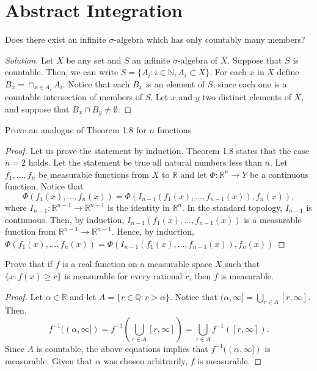 \documentclass[14.5pt]{article}
\newcommand{\N}{\mathbb{N}}
\newcommand{\Q}{\mathbb{Q}}
\newcommand{\R}{\mathbb{R}}
\newenvironment{pr}[2][Problem]{\begin{mdframed}[backgroundcolor=gray!10, leftline = false, rightline=false, linewidth=0.25pt]  \begin{trivlist}
\item[\hskip \labelsep {\bfseries #1}\hskip \labelsep {\bfseries #2.}]}{\end{trivlist} \end{mdframed}  }
\newenvironment{solution}
  {\begin{proof}[Solution]}
  {\end{proof}}
\begin{document}
\section{Abstract Integration}

\begin{pr}{1.1} Does there exist an infinite $\sigma$-algebra which has only countably many members?
\end{pr}
\begin{solution}
Let $X$ be any set and $S$ an infinite $\sigma$-algebra of $X$. Suppose that $S$ is countable. Then, we can write $S = \{A_i: i \in \N, A_i \subset X \}$. For each $x$ in $X$ define $B_x = \cap_{x \in A_i} A_i$. Notice that each $B_x$ is an element of $S$, since each one is a countable intersection of members of $S$. Let $x$ and $y$ two distinct elements of $X$, and suppose that $B_x \cap B_y \neq \emptyset.$ 
\end{solution}


\begin{pr}{1.2} Prove an analogue of Theorem 1.8 for $n$ functions  
\end{pr}
\begin{proof}
Let us prove the statement by induction. Theorem 1.8 states that the case $n = 2$ holds. Let the statement be true all natural numbers less than $n$. Let $f_1, \ldots, f_n$ be measurable functions from $X$ to $\R$ and let $\Phi: \R^n \to Y$ be a continuous function. Notice that 
$$\Phi(f_1(x), \ldots, f_n(x)) = \Phi(I_{n-1}(f_1(x), \ldots, f_{n-1}(x)), f_n(x)),$$
where $I_{n-1}:\R^{n-1} \rightarrow \R^{n-1}$ is the identity in $\R^n$. In the standard topology, $I_{n-1}$ is continuous. Then, by induction, $I_{n-1}(f_1(x), \ldots, f_{n-1}(x))$ is a measurable function from $\R^{n-1} \rightarrow \R^{n-1}$. Hence, by induction, $\Phi(f_1(x), \ldots, f_n(x)) = \Phi(I_{n-1}(f_1(x), \ldots, f_{n-1}(x)), f_n(x))$
    
\end{proof}

\begin{pr}{1.3} Prove that if $f$ is a real function on a measurable space $X$ such that $\{x:f(x) \geq r\}$ is measurable for every rational $r$, then $f$ is measurable.
\end{pr}
\begin{proof}
Let $\alpha \in \R$ and let $A = \{r \in \Q: r > \alpha\}.$ Notice that $(\alpha, \infty] = \bigcup_{r \in A} [r, \infty]$. Then, 
$$f^{-1}((\alpha, \infty]) = f^{-1}\left( \bigcup_{r \in A} [r, \infty] \right) = \bigcup_{r \in A} f^{-1}([r, \infty]).$$
Since $A$ is countable, the above equations implies that $f^{-1}((\alpha, \infty])$ is measurable. Given that $\alpha$ was chosen arbitrarily, $f$ is measurable.
\end{proof}
\end{document}
